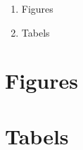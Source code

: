 
\addchap{\langanhang}

{\Large
\begin{enumerate}[label=\Alph*.]
	\item Figures
	\item Tabels
\end{enumerate}
}

\pagebreak

\setcounter{section}{0}
\renewcommand{\thesection}{\Alph{section}}



\section{Figures} \label{ch:figureAppendix}


\pagebreak

\section{Tabels} \label{ch:tableAppendix}

